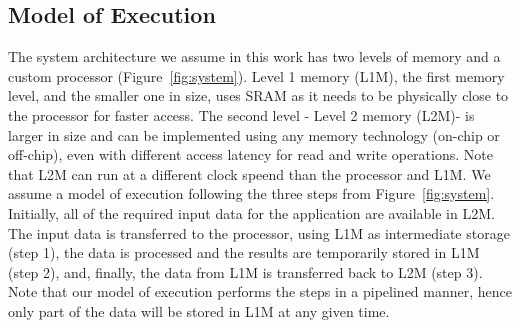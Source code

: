 \vspace{-1mm}
\subsection{Model of Execution}
\label{ssec:system_under_analysis}
\vspace{-1mm}
The system architecture we assume in this work has two levels of memory and a custom processor (Figure~\ref{fig:system}). Level 1 memory (L1M)\footnotemark, the first memory level, and the smaller one in size, uses SRAM as it needs to be physically close to the processor for faster access. The second level - Level 2 memory (L2M)\footnotemark[\value{footnote}] - is larger in size and can be implemented using any memory technology (on-chip or off-chip), even with different access latency for read and write operations. Note that L2M can run at a different clock speend than the processor and L1M. 
We assume a model of execution following the three steps from Figure~\ref{fig:system}. Initially, all of the required input data for the application are available in L2M. The input data is transferred to the processor, using L1M as intermediate storage (step 1), the data is processed and the results are temporarily stored in L1M (step 2), and, finally, the data from L1M is transferred back to L2M (step 3). Note that our model of execution performs the steps in a pipelined manner, hence only part of the data will be stored in L1M at any given time. 



\vspace{-1mm}
